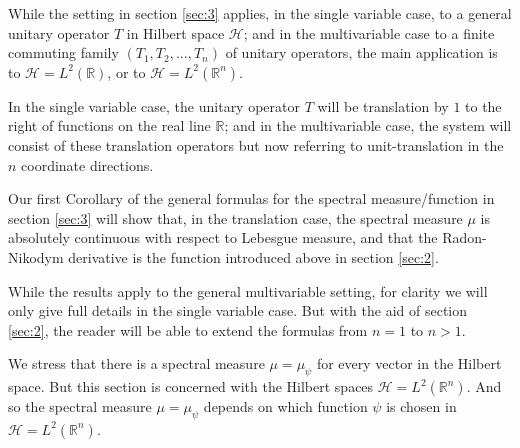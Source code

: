 \documentclass{birkmult}
\theoremstyle{definition}
\theoremstyle{remark}
\numberwithin{equation}{section}
\begin{document}
While the setting in section \ref{sec:3} applies, in the single variable 
case, to a general unitary operator $T$ in Hilbert space $\mathcal{H}$; 
and in the multivariable case to a finite commuting family 
$(T_{1}, T_{2}, ..., T_{n})$ of unitary operators, the main application 
is to $\mathcal{H} = L^{2}(\mathbb{R})$, or to 
$\mathcal{H} = L^{2}(\mathbb{R}^{n})$.

In the single variable case, the unitary operator $T$ will be translation 
by $1$ to the right of functions on the real line $\mathbb{R}$; and in 
the multivariable case, the system will consist of these translation 
operators but now referring to unit-translation in the $n$ coordinate 
directions.

Our first Corollary of the general formulas for the spectral 
measure/function in section \ref{sec:3} will show that, in the 
translation case, the spectral measure $\mu$ is absolutely continuous 
with respect to Lebesgue measure, and that the Radon-Nikodym derivative 
is the function introduced above in section \ref{sec:2}. 

While the results apply to the general multivariable setting, for clarity 
we will only give full details in the single variable case. But with the aid 
of section \ref{sec:2}, the reader will be able to extend the formulas 
from $n = 1$ to $n > 1$.

We stress that there is a spectral measure $\mu = \mu_{\psi}$ for every 
vector in the Hilbert space. But this section is concerned with the 
Hilbert spaces $\mathcal{H} = L^{2}(\mathbb{R}^{n})$. And so the spectral 
measure $\mu = \mu_{\psi}$ depends on which function $\psi$ is chosen in 
$\mathcal{H} = L^{2}(\mathbb{R}^{n})$.
\end{document}
